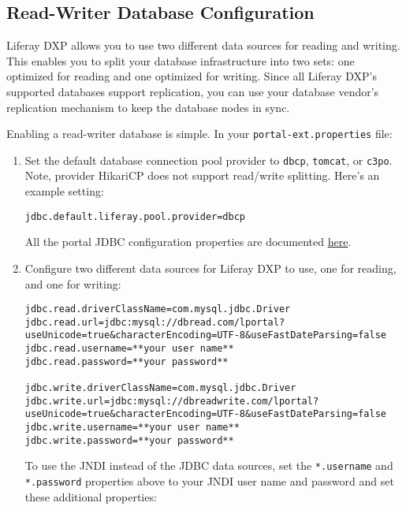 \subsection{Read-Writer Database
Configuration}\label{read-writer-database-configuration}

Liferay DXP allows you to use two different data sources for reading and
writing. This enables you to split your database infrastructure into two
sets: one optimized for reading and one optimized for writing. Since all
Liferay DXP's supported databases support replication, you can use your
database vendor's replication mechanism to keep the database nodes in
sync.

Enabling a read-writer database is simple. In your
\texttt{portal-ext.properties} file:

\begin{enumerate}
\def\labelenumi{\arabic{enumi}.}
\item
  Set the default database connection pool provider to \texttt{dbcp},
  \texttt{tomcat}, or \texttt{c3po}. Note, provider HikariCP does not
  support read/write splitting. Here's an example setting:

\begin{verbatim}
jdbc.default.liferay.pool.provider=dbcp
\end{verbatim}

  All the portal JDBC configuration properties are documented
  \href{@platform-ref@/7.0-latest/propertiesdoc/portal.properties.html\#JDBC}{here}.
\item
  Configure two different data sources for Liferay DXP to use, one for
  reading, and one for writing:

\begin{verbatim}
jdbc.read.driverClassName=com.mysql.jdbc.Driver
jdbc.read.url=jdbc:mysql://dbread.com/lportal?useUnicode=true&characterEncoding=UTF-8&useFastDateParsing=false
jdbc.read.username=**your user name**
jdbc.read.password=**your password**

jdbc.write.driverClassName=com.mysql.jdbc.Driver
jdbc.write.url=jdbc:mysql://dbreadwrite.com/lportal?useUnicode=true&characterEncoding=UTF-8&useFastDateParsing=false
jdbc.write.username=**your user name**
jdbc.write.password=**your password**
\end{verbatim}

  To use the JNDI instead of the JDBC data sources, set the
  \texttt{*.username} and \texttt{*.password} properties above to your
  JNDI user name and password and set these additional properties:


\end{enumerate}
